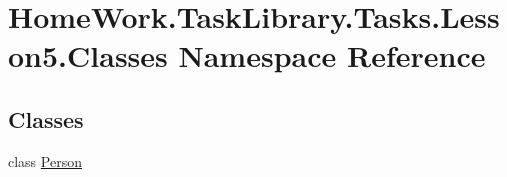 \hypertarget{namespace_home_work_1_1_task_library_1_1_tasks_1_1_lesson5_1_1_classes}{}\section{Home\+Work.\+Task\+Library.\+Tasks.\+Lesson5.\+Classes Namespace Reference}
\label{namespace_home_work_1_1_task_library_1_1_tasks_1_1_lesson5_1_1_classes}
\subsection*{Classes}
\begin{DoxyCompactItemize}
\item 
class \mbox{\hyperlink{class_home_work_1_1_task_library_1_1_tasks_1_1_lesson5_1_1_classes_1_1_person}{Person}}
\end{DoxyCompactItemize}
